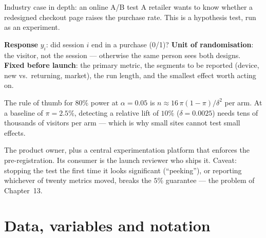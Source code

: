 \documentclass[aspectratio=169,11pt]{beamer}
\begin{document}
\begin{frame}{Industry case in depth: an online A/B test}
  \footnotesize
  A retailer wants to know whether a redesigned checkout page raises the
  purchase rate. This is a hypothesis test, run as an experiment.
  \begin{industry}
    \textbf{Response} $y_i$: did session $i$ end in a purchase (0/1)?
    \textbf{Unit of randomisation}: the visitor, not the session --- otherwise
    the same person sees both designs. \textbf{Fixed before launch}: the
    primary metric, the segments to be reported (device, new vs.\ returning,
    market), the run length, and the smallest effect worth acting on.
  \end{industry}
  \begin{numexample}
    The rule of thumb for $80\%$ power at $\alpha = 0.05$ is
    $n \approx 16\,\pi(1-\pi)/\delta^2$ per arm. At a baseline of $\pi=2.5\%$,
    detecting a relative lift of $10\%$ ($\delta = 0.0025$) needs tens of
    thousands of visitors per arm --- which is why small sites cannot test
    small effects.
  \end{numexample}
  \begin{takeaway}
    The product owner, plus a central experimentation platform that enforces
    the pre-registration. Its consumer is the launch reviewer who ships it.
    Caveat: stopping the test the first time it looks
    significant (``peeking''), or reporting whichever of twenty metrics moved,
    breaks the $5\%$ guarantee --- the problem of Chapter~13.
  \end{takeaway}
\end{frame}


\section{Data, variables and notation}
\end{document}
